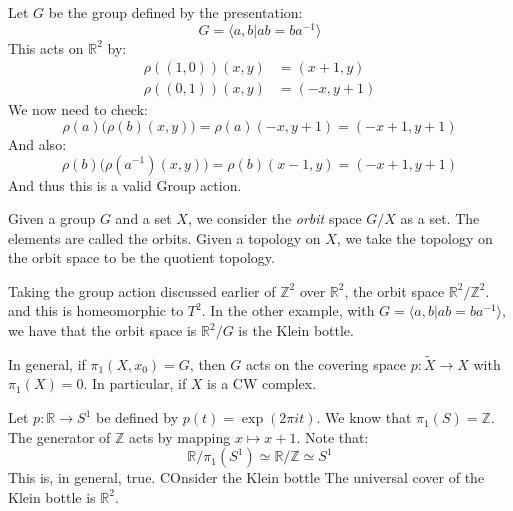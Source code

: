     \begin{example}
        Let $G$ be the group defined by the presentation:
        \begin{equation}
            G=\langle{a,b|ab=ba^{\minus{1}}}\rangle
        \end{equation}
        This acts on $\mathbb{R}^{2}$ by:
        \begin{subequations}
            \begin{align}
                \rho((1,0))(x,y)&=(x+1,y)\\
                \rho((0,1))(x,y)&=(\minus{x},y+1)
            \end{align}
        \end{subequations}
        We now need to check:
        \begin{equation}
            \rho(a)\big(\rho(b)(x,y)\big)=
            \rho(a)(\minus{x},y+1)=
            (\minus{x}+1,y+1)
        \end{equation}
        And also:
        \begin{equation}
            \rho(b)\big(\rho(a^{\minus{1}})(x,y)\big)=
            \rho(b)(x-1,y)=(\minus{x}+1,y+1)
        \end{equation}
        And thus this is a valid Group action.
    \end{example}
    Given a group $G$ and a set $X$, we consider the
    \textit{orbit} space $G/X$ as a set. The elements are
    called the orbits. Given a topology on $X$, we take
    the topology on the orbit space to be the quotient
    topology.
    \begin{example}
        Taking the group action discussed earlier of
        $\mathbb{Z}^{2}$ over $\mathbb{R}^{2}$, the orbit
        space $\mathbb{R}^{2}/\mathbb{Z}^{2}$. and this is
        homeomorphic to $T^{2}$. In the other example, with
        $G=\langle{a,b|ab=ba^{\minus{1}}}\rangle$,
        we have that the orbit space is
        $\mathbb{R}^{2}/G$ is the Klein bottle.
    \end{example}
    In general, if $\pi_{1}(X,x_{0})=G$, then $G$ acts on
    the covering space
    $p:\tilde{X}\rightarrow{X}$ with $\pi_{1}(X)=0$. In
    particular, if $X$ is a CW complex.
    \begin{example}
        Let $p:\mathbb{R}\rightarrow{S}^{1}$ be defined by
        $p(t)=\exp(2\pi{i}t)$. We know that
        $\pi_{1}(S)=\mathbb{Z}$. The generator of
        $\mathbb{Z}$ acts by mapping
        $x\mapsto{x}+1$. Note that:
        \begin{equation}
            \mathbb{R}/\pi_{1}(S^{1})\simeq
            \mathbb{R}/\mathbb{Z}\simeq
            S^{1}
        \end{equation}
        This is, in general, true. COnsider the Klein bottle
        The universal cover of the Klein bottle is
        $\mathbb{R}^{2}$. 
    \end{example}
